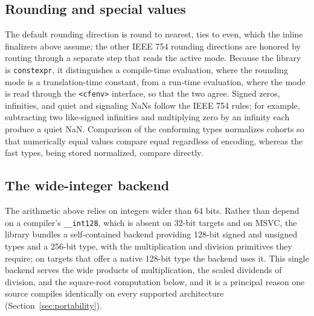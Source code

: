\documentclass[acmsmall]{acmart}
\begin{document}
\subsection{Rounding and special values}
The default rounding direction is round to nearest, ties to even, which the inline
finalizers above assume; the other IEEE 754 rounding directions are honored by routing
through a separate step that reads the active mode. Because the library is
\texttt{constexpr}, it distinguishes a compile-time evaluation, where the rounding mode
is a translation-time constant, from a run-time evaluation, where the mode is read
through the \texttt{<cfenv>} interface, so that the two agree. Signed zeros, infinities,
and quiet and signaling NaNs follow the IEEE 754 rules; for example, subtracting two
like-signed infinities and multiplying zero by an infinity each produce a quiet NaN.
Comparison of the conforming types normalizes cohorts so that numerically equal values
compare equal regardless of encoding, whereas the fast types, being stored normalized,
compare directly.

\subsection{The wide-integer backend}
The arithmetic above relies on integers wider than 64 bits. Rather than depend on a
compiler's \texttt{\_\_int128}, which is absent on 32-bit targets and on MSVC, the
library bundles a self-contained backend providing 128-bit signed and unsigned types and
a 256-bit type, with the multiplication and division primitives they require; on targets
that offer a native 128-bit type the backend uses it. This single backend serves the
wide products of multiplication, the scaled dividends of division, and the square-root
computation below, and it is a principal reason one source compiles identically on every
supported architecture (Section~\ref{sec:portability}).
\end{document}

